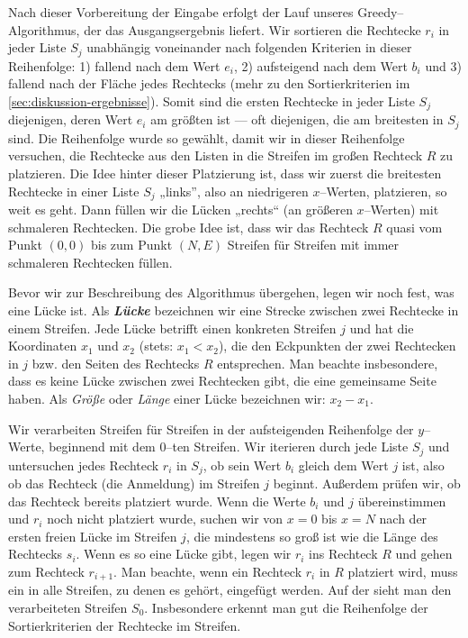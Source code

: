 Nach dieser Vorbereitung der Eingabe erfolgt der Lauf unseres Greedy--Algorithmus, der das
Ausgangsergebnis liefert.
Wir sortieren die Rechtecke $r_i$ in jeder Liste $S_j$ unabhängig voneinander nach folgenden Kriterien
in dieser Reihenfolge: 
1) fallend nach dem Wert $e_i$,
2) aufsteigend nach dem Wert $b_i$ und
3) fallend nach der Fläche jedes Rechtecks
(mehr zu den Sortierkriterien im \cref{sec:diskussion-ergebnisse}).
Somit sind die ersten Rechtecke in jeder Liste $S_j$ diejenigen,
deren Wert $e_i$ am größten ist --- oft diejenigen, die am breitesten in $S_j$ sind.
Die Reihenfolge wurde so gewählt, damit wir in dieser Reihenfolge versuchen,
die Rechtecke aus den Listen in die Streifen im großen Rechteck $R$ zu platzieren.
Die Idee hinter dieser Platzierung ist, dass wir zuerst die breitesten Rechtecke in einer Liste $S_j$
„links”, also an niedrigeren $x$--Werten, platzieren, so weit es geht. Dann füllen wir 
die Lücken „rechts“ (an größeren $x$--Werten) mit schmaleren Rechtecken. 
Die grobe Idee ist, dass wir das Rechteck $R$ quasi vom Punkt $(0,0)$ bis zum Punkt
$(N, E)$ Streifen für Streifen mit immer schmaleren Rechtecken füllen.

Bevor wir zur Beschreibung des Algorithmus übergehen, legen wir noch fest, was
eine Lücke ist. Als \textbf{\textit{Lücke}} bezeichnen wir eine Strecke 
zwischen zwei Rechtecke in einem Streifen. Jede Lücke betrifft einen
konkreten Streifen $j$ und hat die Koordinaten $x_1$ und $x_2$ (stets: $x_1 < x_2$),
die den Eckpunkten der zwei Rechtecken in $j$ bzw. den Seiten des Rechtecks $R$ entsprechen.
Man beachte insbesondere, dass es keine Lücke zwischen zwei Rechtecken gibt,
die eine gemeinsame Seite haben.
Als \textit{Größe} oder \textit{Länge} einer Lücke bezeichnen wir: $x_2 - x_1$.



Wir verarbeiten Streifen für Streifen in der
aufsteigenden Reihenfolge der $y$--Werte, beginnend mit dem 0--ten Streifen.
Wir iterieren durch jede Liste $S_j$ und untersuchen jedes Rechteck $r_i$ in $S_j$, ob sein Wert $b_i$ gleich dem Wert $j$ ist, also ob das Rechteck (die Anmeldung) im Streifen $j$ beginnt.
Außerdem prüfen wir, ob das Rechteck bereits platziert wurde.
Wenn die Werte $b_i$ und $j$ übereinstimmen und $r_i$ noch nicht platziert wurde, 
suchen wir von $x = 0$ bis $x = N$ nach der ersten freien Lücke im Streifen $j$,
die mindestens so groß ist wie die Länge des Rechtecks $s_i$. 
Wenn es so eine Lücke gibt, legen wir $r_i$ ins Rechteck $R$ und gehen zum Rechteck $r_{i+1}$.
Man beachte, wenn ein Rechteck $r_i$ in $R$ platziert wird, muss ein in alle Streifen,
zu denen es gehört, eingefügt werden.
Auf der  sieht man den verarbeiteten Streifen $S_0$.
Insbesondere erkennt man gut die Reihenfolge der Sortierkriterien der Rechtecke
im Streifen.

